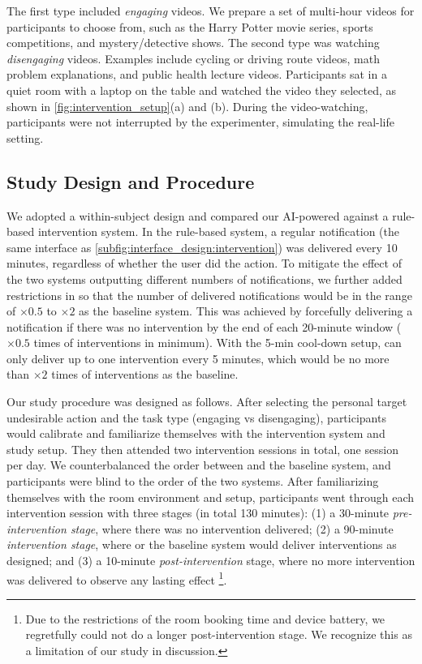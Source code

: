 The first type included \textit{engaging} videos. We prepare a set of multi-hour videos for participants to choose from, such as the Harry Potter movie series, sports competitions, and mystery/detective shows.
The second type was watching \textit{disengaging} videos. Examples include cycling or driving route videos, math problem explanations, and public health lecture videos.
Participants sat in a quiet room with a laptop on the table and watched the video they selected, as shown in \autoref{fig:intervention_setup}(a) and (b).
During the video-watching, participants were not interrupted by the experimenter, simulating the real-life setting. 



\subsection{Study Design and Procedure}
\label{sub:intervention_evaluation:design}
We adopted a within-subject design and compared our AI-powered \projectname against a rule-based intervention system.
In the rule-based system, a regular notification (the same interface as \autoref{subfig:interface_design:intervention}) was delivered every 10 minutes, regardless of whether the user did the action.
To mitigate the effect of the two systems outputting different numbers of notifications, we further added restrictions in \projectname so that the number of delivered notifications would be in the range of $\times 0.5$ to $\times 2$ as the baseline system.
This was achieved by forcefully delivering a notification if there was no intervention by the end of each 20-minute window ($\times 0.5$ times of interventions in minimum).
With the 5-min cool-down setup, \projectname can only deliver up to one intervention every 5 minutes, which would be no more than $\times 2$ times of interventions as the baseline.

Our study procedure was designed as follows. After selecting the personal target undesirable action and the task type (engaging vs disengaging), participants would calibrate and familiarize themselves with the intervention system and study setup. They then attended two intervention sessions in total, one session per day. We counterbalanced the order between \projectname and the baseline system, and participants were blind to the order of the two systems.
After familiarizing themselves with the room environment and setup, participants went through each intervention session with three stages (in total 130 minutes): (1) a 30-minute \textit{pre-intervention stage}, where there was no intervention delivered; (2) a 90-minute \textit{intervention stage}, where \projectname or the baseline system would deliver interventions as designed; and (3) a 10-minute \textit{post-intervention} stage, where no more intervention was delivered to observe any lasting effect \footnote{Due to the restrictions of the room booking time and device battery, we regretfully could not do a longer post-intervention stage. We recognize this as a limitation of our study in discussion.}.

